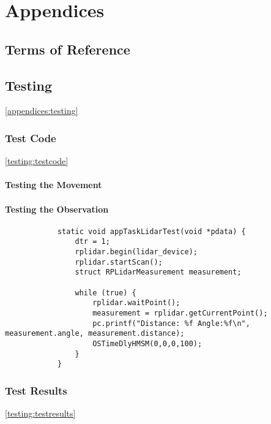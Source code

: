 \part{Appendices}
	\chapter{Terms of Reference}
	
	
	\chapter{Testing}
	\ref{appendices:testing}
		\section{Test Code}
		\ref{testing:testcode}
			\subsection{Testing the Movement}
			\subsection{Testing the Observation}
			\label{testcode:observation1}
			\begin{lstlisting}
			static void appTaskLidarTest(void *pdata) {
				dtr = 1;
				rplidar.begin(lidar_device);
				rplidar.startScan();
				struct RPLidarMeasurement measurement;
				
				while (true) {
					rplidar.waitPoint();
					measurement = rplidar.getCurrentPoint();
					pc.printf("Distance: %f Angle:%f\n", measurement.angle, measurement.distance);
					OSTimeDlyHMSM(0,0,0,100);
				}
			}
				\end{lstlisting}
				
				
		\section{Test Results}
		\ref{testing:testresults}
		
